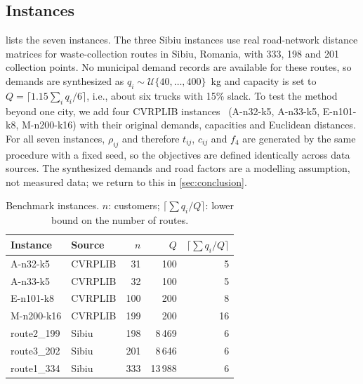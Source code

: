 \subsection{Instances}
 lists the seven instances. The three Sibiu instances use
real road-network distance matrices for waste-collection routes in Sibiu,
Romania, with 333, 198 and 201 collection points. No municipal demand records
are available for these routes, so demands are synthesized as
$q_i\sim\mathcal{U}\{40,\dots,400\}$~kg and capacity is set to
$Q=\lceil 1.15\sum_i q_i/6\rceil$, i.e., about six trucks with 15\% slack. To
test the method beyond one city, we add four CVRPLIB instances~\cite{cvrplib}
(A-n32-k5, A-n33-k5, E-n101-k8, M-n200-k16) with their original demands,
capacities and Euclidean distances. For all seven instances, $\rho_{ij}$ and
therefore $t_{ij}$, $c_{ij}$ and $f_4$ are generated by the same procedure with
a fixed seed, so the objectives are defined identically across data sources.
The synthesized demands and road factors are a modelling assumption, not
measured data; we return to this in \cref{sec:conclusion}.

\begin{table}[t]
\centering
\caption{Benchmark instances. $n$: customers; $\lceil\sum q_i/Q\rceil$: lower
bound on the number of routes.}
\label{tab:instances}
\begin{tabular}{@{}llrrr@{}}
\toprule
Instance & Source & $n$ & $Q$ & $\lceil\sum q_i/Q\rceil$ \\
\midrule
A-n32-k5   & CVRPLIB & 31  & 100    & 5  \\
A-n33-k5   & CVRPLIB & 32  & 100    & 5  \\
E-n101-k8  & CVRPLIB & 100 & 200    & 8  \\
M-n200-k16 & CVRPLIB & 199 & 200    & 16 \\
route2\_199 & Sibiu  & 198 & 8\,469  & 6  \\
route3\_202 & Sibiu  & 201 & 8\,646  & 6  \\
route1\_334 & Sibiu  & 333 & 13\,988 & 6  \\
\bottomrule
\end{tabular}
\end{table}
